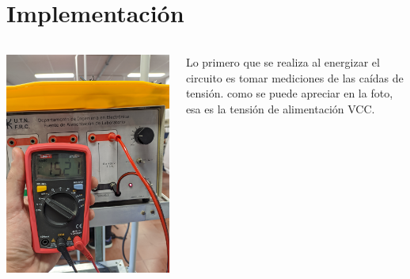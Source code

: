 \section{Implementación}

\begin{frame}{}
  \begin{columns}[c] %
      \centering
      \includegraphics[width=\linewidth]{pictures/VCC.jpg}

      \justifying
        Lo primero que se realiza al energizar el circuito es tomar mediciones de las caídas de tensión. como se puede
        apreciar en la foto, esa es la tensión de alimentación VCC. 
      
  \end{columns}
\end{frame}

